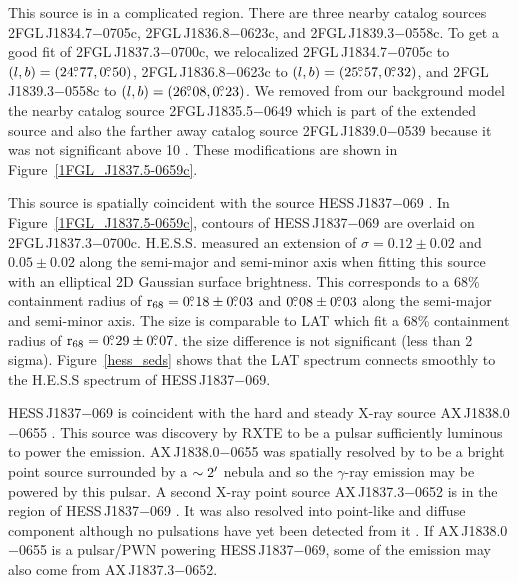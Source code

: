 \documentclass[12pt,preprint]{aastex}
\newcommand{\gev}{\text{GeV}\xspace}
\newcommand{\tev}{\text{TeV}\xspace}
\newcommand{\chandra}{\text{{\em Chandra}}\xspace}
\newcommand{\rsixeight}{{\ensuremath{\text{r}_{68}}}\xspace}
\newcommand{\hl}[1]{#1}
\begin{document}
This source is in a complicated region. There are three nearby
catalog sources 2FGL\,J1834.7$-$0705c, 2FGL\,J1836.8$-$0623c, and
2FGL\,J1839.3$-$0558c.  To get a good fit of 2FGL\,J1837.3$-$0700c, we
relocalized 2FGL\,J1834.7$-$0705c to $(l,b)=(24\mbox{$.\!\!^\circ$}77,0\mbox{$.\!\!^\circ$}50)$,
2FGL\,J1836.8$-$0623c to $(l,b)=(25\mbox{$.\!\!^\circ$}57,0\mbox{$.\!\!^\circ$}32)$, and
2FGL\,J1839.3$-$0558c to $(l,b)=(26\mbox{$.\!\!^\circ$}08,0\mbox{$.\!\!^\circ$}23)$.  We removed from
our background model the
nearby catalog source 2FGL\,J1835.5$-$0649 which is part of the extended
source and also the farther away catalog source 2FGL\,J1839.0$-$0539
because it was not significant above 10 \gev. These modifications are
shown in Figure~\ref{1FGL_J1837.5-0659c}.  

This source is spatially coincident with the \tev source HESS\,J1837$-$069
\citep{hess_plane_survey}.  In Figure~\ref{1FGL_J1837.5-0659c}, contours
of HESS\,J1837$-$069 are overlaid on 2FGL\,J1837.3$-$0700c. H.E.S.S. measured
an extension of $\sigma=0.12\pm0.02$ and $0.05\pm0.02$
along the semi-major and semi-minor axis when fitting this source
with an elliptical 2D Gaussian surface brightness.  This corresponds
to a 68\% containment radius of $\rsixeight=0\fdg18\pm0\fdg03$ and
$0\mbox{$.\!\!^\circ$}08\pm0\mbox{$.\!\!^\circ$}03$ along the semi-major and semi-minor axis. The
size is comparable to LAT which fit a 68\% containment radius of
$\rsixeight=0\fdg29\pm0\fdg07$.  the size difference is not significant
(less than 2 sigma).  Figure~\ref{hess_seds} shows that the LAT spectrum
connects smoothly to the H.E.S.S spectrum of HESS\,J1837$-$069.

\hl{
HESS\,J1837$-$069 is coincident
with the hard and steady X-ray source AX\,J1838.0$-$0655
\citep{einstein_galactic_plane_survey,hard_x-ray_asca,integral_AX_J1838.0-0655,swift_follow_up,pulsations_HESS_J1837-069,suzaku_HESS_J1837-069}.
This source was discovery by RXTE to be a pulsar sufficiently
luminous to power the \tev emission.  AX\,J1838.0$-$0655 was spatially
resolved by \chandra to be a bright point source surrounded by
a $\sim2\mbox{$^\prime$}$ nebula \citep{pulsations_HESS_J1837-069} and so the
$\gamma$-ray emission may be powered by this pulsar.  A second
X-ray point source AX\,J1837.3$-$0652 is in the region of HESS\,J1837$-$069
\citep{hard_x-ray_asca,swift_follow_up,pulsations_HESS_J1837-069,suzaku_HESS_J1837-069}.
It was also resolved into point-like and diffuse component
although no pulsations have yet been detected from it
\citep{pulsations_HESS_J1837-069}.  If AX\,J1838.0$-$0655 is a pulsar/PWN
powering HESS\,J1837$-$069, some of the \tev emission may also come from
AX\,J1837.3$-$0652.
}
\end{document}
